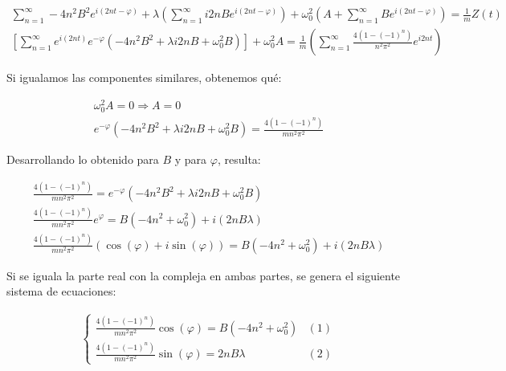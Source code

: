 \begin{gather*}
    \sum_{n=1}^{\infty} -4n^{2}B^{2} e^{i\left(2nt - \varphi\right)} + \lambda\left(\sum_{n=1}^{\infty} i2nB e^{i\left(2nt - \varphi\right)}\right) + \omega_{0}^{2}\left(A + \sum_{n=1}^{\infty} B e^{i\left(2nt - \varphi\right)}\right) = \frac{1}{m} Z(t)\\
    \left[\sum_{n=1}^{\infty} e^{i\left(2nt\right)}e^{-\varphi} \left(-4n^{2}B^{2} + \lambda i2nB + \omega_{0}^{2} B\right) \right] + \omega_{0}^{2} A = \frac{1}{m} \left(\sum_{n=1}^{\infty} \frac{4\left(1-(-1)^{n}\right)}{n^{2}\pi^{2}} e^{i2nt}\right)
\end{gather*}
\begin{center}
    Si igualamos las componentes similares, obtenemos qué:
\end{center}
\begin{gather*}
    \omega_{0}^{2} A = 0 \Longrightarrow A = 0\\
    e^{-\varphi} \left(-4n^{2}B^{2} + \lambda i2nB + \omega_{0}^{2} B\right) = \frac{4\left(1-(-1)^{n}\right)}{mn^{2}\pi^{2}}
\end{gather*}
\begin{center}
    Desarrollando lo obtenido para $B$ y para $\varphi$, resulta:
\end{center}
\begin{gather*}
    \frac{4\left(1-(-1)^{n}\right)}{mn^{2}\pi^{2}} = e^{-\varphi} \left(-4n^{2}B^{2} + \lambda i2nB + \omega_{0}^{2} B\right)\\
    \frac{4\left(1-(-1)^{n}\right)}{mn^{2}\pi^{2}} e^{\varphi} = B\left(-4n^{2} + \omega_{0}^{2}\right) + i\left(2nB\lambda\right)\\
    \frac{4\left(1-(-1)^{n}\right)}{mn^{2}\pi^{2}} \left(\cos(\varphi) + i\sin(\varphi)\right) = B\left(-4n^{2} + \omega_{0}^{2}\right) + i\left(2nB\lambda\right)
\end{gather*}
\begin{center}
    Si se iguala la parte real con la compleja en ambas partes, se genera el siguiente sistema de ecuaciones:
\end{center}
\begin{gather*}
    \begin{cases}
    \frac{4\left(1-(-1)^{n}\right)}{mn^{2}\pi^{2}} \cos(\varphi) = B\left(-4n^{2} + \omega_{0}^{2}\right) & (1)\\
    \frac{4\left(1-(-1)^{n}\right)}{mn^{2}\pi^{2}} \sin(\varphi) = 2nB\lambda & (2)
    \end{cases}
\end{gather*}
